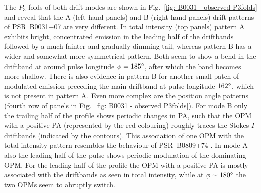 The $P_3$-folds of both drift modes are shown in Fig.~\ref{fig: B0031 - observed P3folds} and reveal that the A (left-hand panels) and B (right-hand panels) drift patterns of PSR~B0031$-$07 are very different. In total intensity (top panels) pattern A exhibits bright, concentrated emission in the leading half of the driftbands followed by a much fainter and gradually dimming tail, whereas pattern B has a wider and somewhat more symmetrical pattern. Both seem to show a bend in the driftband at around pulse longitude $\phi = 185^\circ$, after which the band becomes more shallow. There is also evidence in pattern B for another small patch of modulated emission preceding the main driftband at pulse longitude $162^\circ$, which is not present in pattern A. Even more complex are the position angle patterns (fourth row of panels in Fig.~\ref{fig: B0031 - observed P3folds}). For mode B only the trailing half of the profile shows periodic changes in PA, such that the OPM with a positive PA (represented by the red colouring) roughly traces the Stokes $I$ driftbands (indicated by the contours). This association of one OPM with the total intensity pattern resembles the behaviour of PSR~B0809+74 \citep{RRS+2002}. In mode A also the leading half of the pulse shows periodic modulation of the dominating OPM. For the leading half of the profile the OPM with a positive PA is mostly associated with the driftbands as seen in total intensity, while at $\phi \sim 180^\circ$ the two OPMs seem to abruptly switch.

